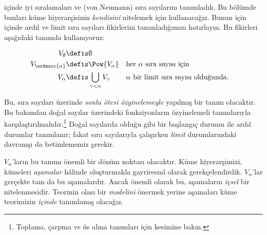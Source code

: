 



 içinde iyi sıralamaları ve (von Neumann)
sıra sayılarını tanımladık. Bu bölümde bunları küme hiyerarşisinin
\emph{kendisini} nitelemek için kullanacağız. Bunun için
 içinde ardıl ve limit sıra sayıları
fikirlerini tanımladığımızı hatırlayın. Bu fikirleri aşağıdaki tanımda
kullanıyoruz:

\begin{defn}
	\begin{align*}
	V_\emptyset &\defis \emptyset\\
	V_{\ordsucc{\alpha}} &\defis \Pow{V_\alpha} & &
	\text{her $\alpha$ sıra sayısı için}\\
	V_{\alpha} &\defis \bigcup_{\gamma < \alpha} V_\gamma & &
	\text{$\alpha$ bir limit sıra sayısı olduğunda.}
\end{align*}
\end{defn}
\noindent
Bu, sıra sayıları üzerinde \emph{sonlu ötesi özyinelemeyle} yapılmış bir
tanım olacaktır. Bu bakımdan doğal sayılar üzerindeki fonksiyonların
özyinelemeli tanımlarıyla karşılaştırılmalıdır.\footnote{Toplama, çarpma ve
üs alma tanımları için  kesimine
bakın.} Doğal sayılarda olduğu gibi bir başlangıç durumu ile ardıl durumlar
tanımlanır; fakat sıra sayılarıyla çalışırken \emph{limit} durumlarındaki
davranışı da betimlememiz gerekir.

$V_\alpha$'ların bu tanımı önemli bir dönüm noktası olacaktır. Küme
hiyerarşimizi, kümeleri \emph{aşamalar} hâlinde oluşturmakla gayriresmî
olarak gerekçelendirdik. $V_\alpha$'lar gerçekte tam da bu aşamalardır.
Ancak önemli olarak bu, aşamaların \emph{içsel} bir nitelenmesidir. Teorinin
olası bir \emph{modelini} önermek yerine aşamaları küme teorimizin
\emph{içinde} tanımlamış olacağız.

